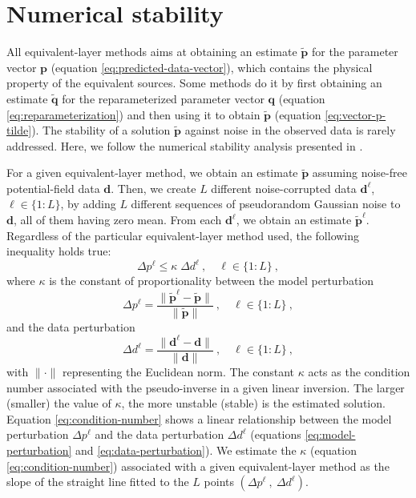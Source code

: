 \section{Numerical stability}

All equivalent-layer methods aims at obtaining an estimate $\tilde{\mathbf{p}}$ for the parameter vector 
$\mathbf{p}$ (equation \ref{eq:predicted-data-vector}), which contains the physical property of the equivalent sources.
Some methods do it by first obtaining an estimate $\tilde{\mathbf{q}}$ for the reparameterized parameter vector $\mathbf{q}$
(equation \ref{eq:reparameterization}) and then using it to obtain $\tilde{\mathbf{p}}$ (equation \ref{eq:vector-p-tilde}).
The stability of a solution $\tilde{\mathbf{p}}$ against noise in the observed data is rarely addressed.
Here, we follow the numerical stability analysis presented in \citet{siqueira-etal2017}.

For a given equivalent-layer method, we obtain an estimate $\tilde{\mathbf{p}}$ assuming noise-free potential-field data $\mathbf{d}$.
Then, we create $L$ different noise-corrupted data $\mathbf{d}^{\ell}$, $\ell \in \{1:L\}$, by adding 
$L$ different sequences of pseudorandom Gaussian noise to $\mathbf{d}$, all of them having zero mean. 
From each $\mathbf{d}^{\ell}$, we obtain an estimate $\tilde{\mathbf{p}}^{\ell}$. 
Regardless of the particular equivalent-layer method used, the following inequality \citep[][ p. 66]{aster_etal2019} 
holds true:
\begin{equation}
	\Delta p^{\ell} \leq \kappa \; \Delta d^{\ell} \: , \quad \ell \in \{1:L\} \: ,
	\label{eq:condition-number}
\end{equation}
where $\kappa$ is the constant of proportionality between the model perturbation
\begin{equation}
	\Delta p^{\ell} = \frac{\| \tilde{\mathbf{p}}^{\ell} - \tilde{\mathbf{p}} \|}{\| \tilde{\mathbf{p}} \|}
	\: , \quad \ell \in \{1:L\} \: ,
	\label{eq:model-perturbation}
\end{equation}
and the data perturbation
\begin{equation}
	\Delta d^{\ell} = \frac{\| \mathbf{d}^{\ell} - \mathbf{d} \|}{\| \mathbf{d} \|}
	\: , \quad \ell \in \{1:L\} \: ,
	\label{eq:data-perturbation}
\end{equation}
with $\| \cdot \|$ representing the Euclidean norm.
The constant $\kappa$ acts as the condition number associated with the pseudo-inverse in a given linear inversion.
The larger (smaller) the value of $\kappa$, the more unstable (stable) is the estimated solution.
Equation \ref{eq:condition-number} shows a linear relationship between the model perturbation $\Delta p^{\ell}$ and 
the data perturbation $\Delta d^{\ell}$ (equations \ref{eq:model-perturbation} and \ref{eq:data-perturbation}).
We estimate the $\kappa$ (equation \ref{eq:condition-number}) associated with a given 
equivalent-layer method as the slope of the straight line fitted to the $L$ points 
$\left( \Delta p^{\ell} \: , \: \Delta d^{\ell} \right)$.

